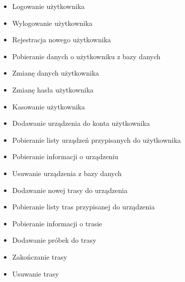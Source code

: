 \begin{itemize}
\item Logowanie użytkownika
\item Wylogowanie użytkownika
\item Rejestracja nowego użytkownika
\item Pobieranie danych o użytkowniku z bazy danych
\item Zmianę danych użytkownika
\item Zmianę hasła użytkownika
\item Kasowanie użytkownika
\item Dodawanie urządzenia do konta użytkownika
\item Pobieranie listy urządzeń przypisanych do użytkownika
\item Pobieranie informacji o urządzeniu
\item Usuwanie urządzenia z bazy danych
\item Dodawanie nowej trasy do urządzenia
\item Pobieranie listy tras przypisanej do urządzenia
\item Pobieranie informacji o trasie
\item Dodawanie próbek do trasy
\item Zakończanie trasy
\item Usuwanie trasy
\end{itemize}